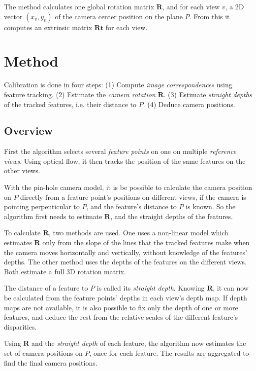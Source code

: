 \documentclass{scrreprt}
\newcommand{\matr}[1]{\mathbf{#1}}
\begin{document}
The method calculates one global rotation matrix $\matr{R}$, and for each view $v$, a 2D vector $(x_v, y_v)$ of the camera center position on the plane $P$. From this it computes an extrinsic matrix $\matr{Rt}$ for each view.



\chapter{Method}
Calibration is done in four steps: (1) Compute \emph{image correspondences} using feature tracking. (2) Estimate the \emph{camera rotation} $\matr{R}$. (3) Estimate \emph{straight depths} of the tracked features, i.e. their distance to $P$. (4) Deduce camera positions.

\section{Overview}
First the algorithm selects several \emph{feature points} on one on multiple \emph{reference views}. Using optical flow, it then tracks the position of the same features on the other views.

With the pin-hole camera model, it is be possible to calculate the camera position on $P$ directly from a feature point's positions on different views, if the camera is pointing perpenticular to $P$, and the feature's distance to $P$ is known. So the algorithm first needs to estimate $\matr{R}$, and the straight depths of the features.

To calculate $\matr{R}$, two methods are used. One uses a non-linear model which estimates $\matr{R}$ only from the slope of the lines that the tracked features make when the camera moves horizontally and vertically, without knowledge of the features' depths. The other method uses the depths of the features on the different views. Both estimate a full 3D rotation matrix.

The distance of a feature to $P$ is called its \emph{straight depth}. Knowing $\matr{R}$, it can now be calculated from the feature points' depths in each view's depth map. If depth maps are not available, it is also possible to fix only the depth of one or more features, and deduce the rest from the relative scales of the different feature's disparities. 

Using $\matr{R}$ and the \emph{straight depth} of each feature, the algorithm now estimates the set of camera positions on $P$, once for each feature. The results are aggregated to find the final camera positions.
\end{document}
